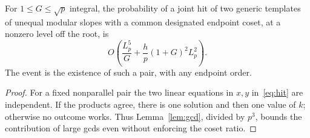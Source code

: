 \begin{proposition}\label{prop:nonparallel}
For $1\le G\le\sqrt p$ integral, the probability of a joint hit of two generic templates of unequal modular slopes with a common designated endpoint coset, at a nonzero level off the root, is
\begin{equation}\label{eq:nonparallel}
 O\left(\frac{L_p^5}{G}+\frac{h}{p}(1+G)^2 L_p^2\right).
\end{equation}
The event is the existence of such a pair, with any endpoint order.
\end{proposition}
\begin{proof}
For a fixed nonparallel pair the two linear equations in $x,y$ in~\eqref{eq:hit} are independent. If the products agree, there is one solution and then one value of $k$; otherwise no outcome works. Thus Lemma~\ref{lem:gcd}, divided by $p^3$, bounds the contribution of large gcds even without enforcing the coset ratio.


\end{proof}
